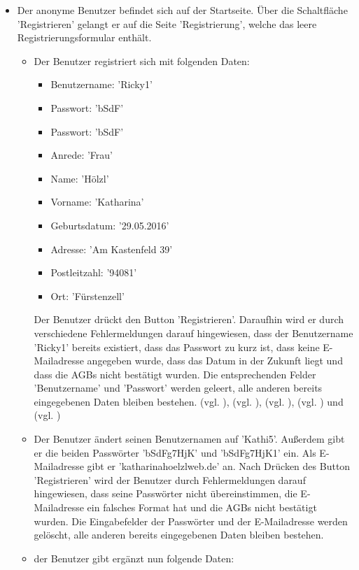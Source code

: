 \documentclass[a4paper]{scrreprt}
\begin{document}
\begin{itemize}
					
				\item {} 
				 Der anonyme Benutzer befindet sich auf der Startseite. Über die Schaltfläche 'Registrieren' gelangt er auf die Seite 'Registrierung', welche das leere Registrierungsformular enthält. 		
					\begin{itemize}
						\item Der Benutzer registriert sich mit folgenden Daten: 
							\begin{itemize}
								\item Benutzername: 'Ricky1'
								\item Passwort: 'bSdF'
								\item Passwort: 'bSdF'
								\item Anrede: 'Frau'
								\item Name: 'Hölzl'
								\item Vorname: 'Katharina'
								\item Geburtsdatum: '29.05.2016'
								\item Adresse: 'Am Kastenfeld 39'
								\item Postleitzahl: '94081'
								\item Ort: 'Fürstenzell'
							\end{itemize}
						Der Benutzer drückt den Button 'Registrieren'. Daraufhin wird er durch verschiedene Fehlermeldungen darauf hingewiesen, dass der Benutzername 'Ricky1' bereits existiert, dass das Passwort zu kurz ist, dass keine E-Mailadresse angegeben wurde, dass das Datum in der Zukunft liegt und dass die AGBs nicht bestätigt wurden. Die entsprechenden Felder 'Benutzername' und 'Passwort' werden geleert, alle anderen bereits eingegebenen Daten bleiben bestehen. (vgl. ), (vgl. ), (vgl. ), (vgl. ) und (vgl. )
						
						\item Der Benutzer ändert seinen Benutzernamen auf 'Kathi5'. Außerdem gibt er die beiden Passwörter 'bSdFg7HjK' und 'bSdFg7HjK1' ein. Als E-Mailadresse gibt er 'katharinahoelzlweb.de' an. Nach Drücken des Button 'Registrieren' wird der Benutzer durch Fehlermeldungen darauf hingewiesen, dass seine Passwörter nicht übereinstimmen, die E-Mailadresse ein falsches Format hat und die AGBs nicht bestätigt wurden. Die Eingabefelder der Passwörter und der E-Mailadresse werden gelöscht, alle anderen bereits eingegebenen Daten bleiben bestehen.
						
						\item der Benutzer gibt ergänzt nun folgende Daten: 
							\begin{itemize}


\end{itemize}
\end{itemize}
\end{itemize}
\end{document}
